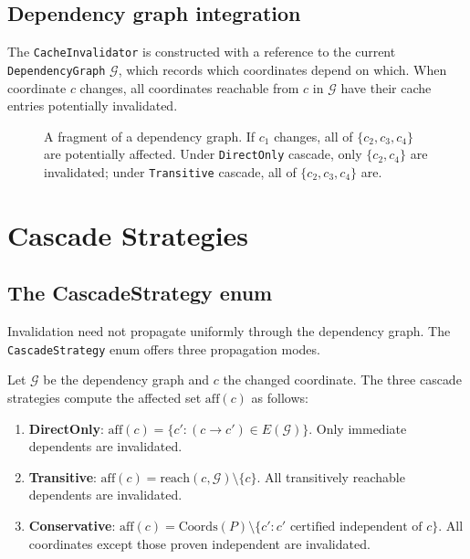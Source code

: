\documentclass[11pt]{article}
\newcommand{\DepGraph}{\mathcal{G}}                %
\newcommand{\reachable}{\mathrm{reach}}            %
\newcommand{\affected}{\mathrm{aff}}               %
\begin{document}
\subsection{Dependency graph integration}

The \texttt{CacheInvalidator} is constructed with a reference to the
current \texttt{DependencyGraph} $\DepGraph$, which records which
coordinates depend on which.  When coordinate $c$ changes, all
coordinates reachable from $c$ in $\DepGraph$ have their cache entries
potentially invalidated.

\begin{figure}[t]
\centering
{}
\caption{A fragment of a dependency graph.  If $c_1$ changes,
all of $\{c_2, c_3, c_4\}$ are potentially affected.  Under
\texttt{DirectOnly} cascade, only $\{c_2, c_4\}$ are invalidated;
under \texttt{Transitive} cascade, all of $\{c_2, c_3, c_4\}$ are.}
\label{fig:dep-graph}
\end{figure}

\section{Cascade Strategies}\label{sec:cascade}

\subsection{The CascadeStrategy enum}

Invalidation need not propagate uniformly through the dependency graph.
The \texttt{CascadeStrategy} enum offers three propagation modes.

\begin{definition}\label{def:cascade}
Let $\DepGraph$ be the dependency graph and $c$ the changed
coordinate.  The three cascade strategies compute the affected set
$\affected(c)$ as follows:
\begin{enumerate}[label=(\roman*)]
\item \textbf{DirectOnly}: $\affected(c) = \{c' : (c \to c') \in E(\DepGraph)\}$.
  Only immediate dependents are invalidated.
\item \textbf{Transitive}: $\affected(c) = \reachable(c, \DepGraph)
  \setminus \{c\}$.
  All transitively reachable dependents are invalidated.
\item \textbf{Conservative}: $\affected(c) = \mathrm{Coords}(P) \setminus
  \{c' : c' \text{ certified independent of } c\}$.
  All coordinates except those proven independent are invalidated.
\end{enumerate}
\end{definition}
\end{document}
